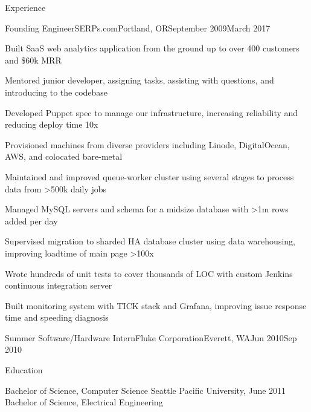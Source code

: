 \documentclass[letterpaper,10pt]{article}
\begin{document}
\begin{rsection}{Experience}
\begin{rexperienceitem}{Founding Engineer}{SERPs.com}{Portland, OR}{September 2009}{March 2017}
  \item Built SaaS web analytics application from the ground up to over 400 customers and \$60k MRR
  \item Mentored junior developer, assigning tasks, assisting with questions, and introducing to the codebase
  \item Developed Puppet spec to manage our infrastructure, increasing reliability and reducing deploy time 10x
  \item Provisioned machines from diverse providers including Linode, DigitalOcean, AWS, and colocated bare-metal
  \item Maintained and improved queue-worker cluster using several stages to process data from \textgreater500k daily jobs
  \item Managed MySQL servers and schema for a midsize database with \textgreater1m rows added per day
  \item Supervised migration to sharded HA database cluster using data warehousing,
        improving loadtime of main page \textgreater100x
  \item Wrote hundreds of unit tests to cover thousands of LOC with custom Jenkins continuous integration server
  \item Built monitoring system with TICK stack and Grafana, improving issue response time and speeding diagnosis
\end{rexperienceitem}
\begin{rexperience}{Summer Software/Hardware Intern}{Fluke Corporation}{Everett, WA}{Jun 2010}{Sep 2010}
\end{rexperience}
\end{rsection}

\begin{rsection}{Education}
\begin{rcontent}{Bachelor of Science, Computer Science
  \textnormal{%
      \sffamily
      \normalsize
      \hfill
      Seattle Pacific University, June 2011}\\
  Bachelor of Science, Electrical Engineering
}
\end{rcontent}
\end{rsection}
\end{document}
